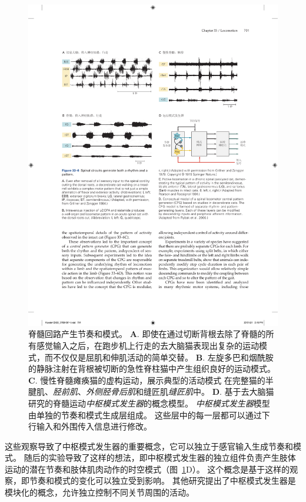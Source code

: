 \begin{figure}[htbp]
	\centering
	\includegraphics[width=1.0\linewidth]{chap33/fig_33_6}
	\caption{脊髓回路产生节奏和模式。
	\textbf{A}. 即使在通过切断背根去除了脊髓的所有感觉输入之后，在跑步机上行走的去大脑猫表现出复杂的运动模式，而不仅仅是屈肌和伸肌活动的简单交替\cite{grillner1984effect}。
	\textbf{B}. 左旋多巴和烟酰胺的静脉注射在背根被切断的急性脊柱猫中产生组织良好的运动模式\cite{grillner1979central}。
	\textbf{C}. 慢性脊髓瘫痪猫的虚构运动，展示典型的活动模式 在完整猫的半腱肌、\textit{胫前肌}、\textit{外侧胫骨后肌}和缝匠肌\textit{缝匠肌}中\cite{pearson1991fictive}。
	\textbf{D}. 基于去大脑猫研究的脊髓运动\textit{中枢模式发生器}的概念模型。
	\textit{中枢模式发生器}模型由单独的节奏和模式生成层组成。
	这些层中的每一层都可以通过下行输入和外围传入信息进行修改\cite{rybak2006modelling}。}
	\label{fig:33_6}
\end{figure}


这些观察导致了中枢模式发生器的重要概念，它可以独立于感官输入生成节奏和模式。
随后的实验导致了这样的想法，即中枢模式发生器的独立组件负责产生肢体运动的潜在节奏和肢体肌肉动作的时空模式（图~\ref{fig:33_6}D）。
这个概念是基于这样的观察，即节奏和模式的变化可以独立受到影响。
其他研究提出了中枢模式发生器是模块化的概念，允许独立控制不同关节周围的活动。


